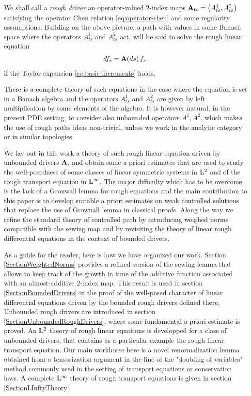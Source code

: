 \documentclass[11pt,a4paper]{amsart}
\newcommand{\ssk}{\smallskip}
\numberwithin{equation}{section} %
\begin{document}
\medskip

We shall call a \emph{rough driver} an operator-valued $2$-index maps ${\bf A}_{ts}=\big(A^1_{ts},A^2_{ts}\big)$ satisfying the operator Chen relation \eqref{eq:operator-chen} and some regularity assumptions. Building on the above picture, a path with values in some Banach space where the operators $A^1_{ts}$ and $A^2_{ts}$ act, will be said to solve the rough linear equation
$$
df_s = {\bf A}(ds)\,f_s.
$$
if the Taylor expansion \eqref{eq:basic-increments} holds.

\ssk

There is a complete theory of such equations in the case where the equation is set in a Banach algebra and the operators $A^1_{ts}$ and $A^2_{ts}$ are given by left multiplication by some elements of the algebra. It is however natural, in the present PDE setting, to consider also unbounded operators $A^1, A^2$, which makes the use of rough paths ideas non-trivial, unless we work in the analytic category or in similar topologies. 

\medskip
 
We lay out in this work a theory of such rough linear equation driven by unbounded drivers $\bf A$, and obtain some a priori estimates that are used to study the well-posedness of some classes of linear symmetric systems in $\mathbb{L}^2$ and of the rough transport equation in $\mathbb{L}^\infty$. The major difficulty which has to be overcome is the lack of a Gronwall lemma for rough equations and the main contribution to this paper is to develop suitable a priori estimates on weak controlled solutions that replace the use of Grownall lemma in classical proofs. Along the way we refine the standard theory of controlled path by introducing weighed norms compatible with the sewing map and by revisiting the theory of linear rough differential equations in the context of bounded drivers. 

\medskip

As a guide for the reader, here is how we have organized our work. Section \ref{SectionWeightedNorms} provides a refined version of the sewing lemma that allows to keep track of the growth in time of the additive function associated with an almost-additive $2$-index map. This result is used in section \ref{SectionBoundedDrivers} in the proof of the well-posed character of linear differential equations driven by the bounded rough drivers defined there. Unbounded rough drivers are introduced in section \ref{SectionUnboundedRoughDrivers}, where some fundamental a priori estimate is proved. An $\mathbb{L}^2$ theory of rough linear equations is developped for a class of unbounded drivers, that contains as a particular example the rough linear transport equation. Our main workhorse here is a novel renormalization lemma obtained from a tensorization argument in the line of the "doubling of variables" method commonly used in the setting of transport equations or conservation laws. A complete $\mathbb{L}^\infty$ theory of rough transport equations is given in section \ref{SectionLInftyTheory}.
\end{document}
